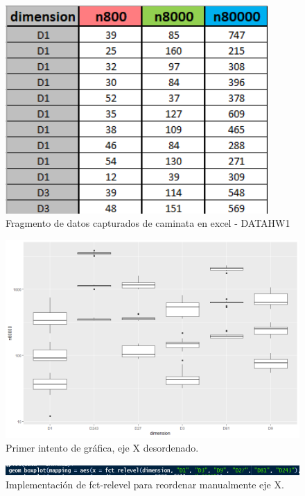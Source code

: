 \documentclass{article}
\begin{document}
\begin{figure} %
    \centering
    \includegraphics[width=100mm]{figura 2.PNG} %
    \caption{Fragmento de datos capturados de caminata en excel - DATAHW1}
    \label{figura 2}
\end{figure}

\begin{figure} %
    \centering
    \includegraphics[width=150mm]{figura 3.PNG} %
    \caption{Primer intento de gr\'afica, eje X desordenado.}
    \label{figura 3}
\end{figure}

\begin{figure} %
    \centering
    \includegraphics[width=150mm]{figura 4.PNG} %
    \caption{Implementaci\'on de fct-relevel para reordenar manualmente eje X.}
    \label{figura 4}
\end{figure}
\end{document}
